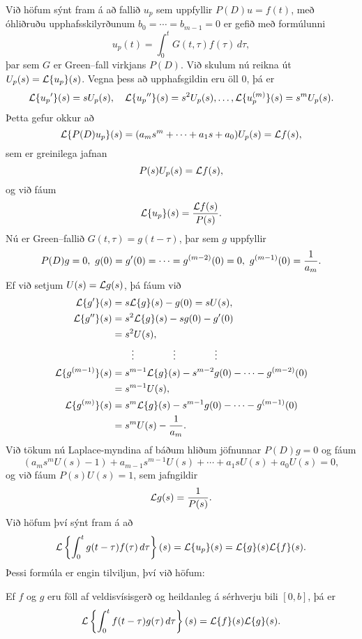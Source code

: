 Við höfum
sýnt fram á að fallið $u_p$ sem uppfyllir $P(D)u=f(t)$, með
óhliðruðu upphafsskilyrðunum $b_0=\cdots=b_{m-1}=0$ er gefið með
formúlunni
 \begin{equation*}u_p(t)=\int_0^tG(t,\tau) f(\tau)\, d\tau,\label{7.4.3}
 \end{equation*}
þar sem $G$ er Green--fall virkjans $P(D)$.
Við skulum nú reikna út $U_p(s)={\cal L}{\{u_p\}}(s)$.  Vegna
þess að upphafsgildin
eru öll 0, þá er
\begin{equation*}
{\cal L}{\{u_p{\sp{\prime}}\}}(s)=sU_p(s), \quad 
{\cal L}{\{u_p{\sp{\prime\prime}}\}}(s)=s^2U_p(s),\dots,
{\cal L}{\{u_p^{(m)}\}}(s)=s^mU_p(s).
\end{equation*}
Þetta gefur okkur að 
$$ {\cal L}{\{P(D)u_p\}}(s)=(a_ms^m+\cdots+a_1s+a_0)U_p(s)={\cal L} f(s), $$
sem er greinilega jafnan
$$ P(s)U_p(s)={\cal L} f(s), $$
og við fáum 
\begin{equation*}
{\cal L}{\{u_p\}}(s)=\dfrac {{\cal L} f(s)}{P(s)}.\label{7.4.4}
\end{equation*}
Nú er Green--fallið $G(t,\tau)=g(t-\tau)$, þar sem $g$ uppfyllir
$$
P(D)g=0, \  g(0)=g\dash(0)=\cdots=g^{(m-2)}(0)=0, \ 
g^{(m-1)}(0)=\dfrac 1{a_m}.  
$$ 
Ef við setjum  $U(s)={\cal L} g(s)$, þá fáum við
\begin{align*}
{\cal L}{\{g{\sp{\prime}}\}}(s) &= s{\cal L}{\{g\}}(s)-g(0)=sU(s),\\
{\cal L}{\{g{\sp{\prime\prime}}\}}(s) &= s^2{\cal L}{\{g\}}(s)-sg(0)-g{\sp{\prime}}(0)\\
&=s^2U(s),\\
&\qquad \vdots\qquad\qquad\vdots\qquad\qquad \vdots\\
{\cal L}{\{g^{(m-1)}\}}(s) &=
s^{m-1}{\cal L}{\{g\}}(s)-s^{m-2}g(0)-\cdots-g^{(m-2)}(0)\\
&=s^{m-1}U(s),\\
{\cal L}{\{g^{(m)}\}}(s) &=
s^m{\cal L}{\{g\}}(s)-s^{m-1}g(0)-\cdots-g^{(m-1)}(0)\\
&=s^mU(s)-\dfrac 1{a_m}.
\end{align*}
Við tökum nú Laplace-myndina af báðum hliðum jöfnunnar $P(D)g=0$ og fáum
$$ (a_ms^mU(s)-1)+a_{m-1}s^{m-1}U(s)+\cdots+a_1sU(s)+a_0U(s)=0, $$
og við fáum $P(s)U(s)=1$, sem jafngildir
\begin{equation*}
{\cal L} g(s)=\dfrac 1{P(s)}.\label{7.4.5}
\end{equation*}
Við höfum því sýnt fram á að 
$$
{\cal L}\left\{\int_0^tg(t-\tau)f(\tau)\, d\tau\right\}(s)= {\cal L}{\{u_p\}}(s)=
{\cal L}{\{g\}}(s){\cal L}{\{f\}}(s).
$$
Þessi formúla er engin tilviljun, því við höfum:

\begin{se}\label{set7.4.1}  Ef $f$ og $g$ eru föll af veldisvísisgerð
og heildanleg á sérhverju bili $[0,b]$, þá er
 $${\cal L}\left\{\int_0^tf(t-\tau)g(\tau)\, d\tau\right\}(s)=
{\cal L}{\{f\}}(s){\cal L}{\{g\}}(s).
 $$
\end{se}

